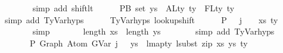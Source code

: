 \begin{isabellebody}
\ \ \ \ \ \ \isamarkupfalse%
\ {\isacharparenleft}{\kern0pt}simp\ add{\isacharcolon}{\kern0pt}\ shift{\isacharunderscore}{\kern0pt}lt{\isacharparenright}{\kern0pt}\isanewline
\isanewline
\ \ \ \ \isamarkupfalse%
\ P{}B{\isacharcolon}{\kern0pt}\ {\isachardoublequoteopen}set\ ys\ {\isasyminter}\ ALty\ ty{\isacharprime}{\kern0pt}\ {\isacharminus}{\kern0pt}\ FLty\ ty{\isacharprime}{\kern0pt}\ {\isacharequal}{\kern0pt}\ {\isacharbraceleft}{\kern0pt}{\isacharbraceright}{\kern0pt}{\isachardoublequoteclose}\isanewline
\ \ \ \ \ \ \isamarkupfalse%
\ {\isacharparenleft}{\kern0pt}simp\ add{\isacharcolon}{\kern0pt}\ TyVar{\isachardot}{\kern0pt}hyps{\isacharparenleft}{\kern0pt}{}{\isacharparenright}{\kern0pt}{\isacharparenright}{\kern0pt}\isanewline
\isanewline
\ \ \ \ \isamarkupfalse%
\ TyVar{\isachardot}{\kern0pt}hyps{\isacharparenleft}{\kern0pt}{}{\isacharparenright}{\kern0pt}\ lookup{\isacharunderscore}{\kern0pt}shift\isanewline
\ \ \ \ \isamarkupfalse%
\ P{}{\isacharcolon}{\kern0pt}\ {\isachardoublequoteopen}{\isasymGamma}{}\ {\isacharbang}{\kern0pt}\ {\isacharparenleft}{\kern0pt}j\ {\isacharminus}{\kern0pt}\ {}{\isacharparenright}{\kern0pt}\ {\isacharequal}{\kern0pt}\ {\isacharparenleft}{\kern0pt}xs{\isacharprime}{\kern0pt}{\isacharcomma}{\kern0pt}\ ty{\isacharprime}{\kern0pt}{\isacharparenright}{\kern0pt}{\isachardoublequoteclose}\isanewline
\ \ \ \ \ \ \isamarkupfalse%
\ simp\isanewline
\isanewline
\ \ \ \ \isamarkupfalse%
\ \isamarkupfalse%
\ {\isachardoublequoteopen}length\ xs{\isacharprime}{\kern0pt}\ {\isacharequal}{\kern0pt}\ length\ ys{\isachardoublequoteclose}\isanewline
\ \ \ \ \ \ \isamarkupfalse%
\ {\isacharparenleft}{\kern0pt}simp\ add{\isacharcolon}{\kern0pt}\ TyVar{\isachardot}{\kern0pt}hyps{\isacharparenleft}{\kern0pt}{}{\isacharcomma}{\kern0pt}{}{\isacharparenright}{\kern0pt}{\isacharparenright}{\kern0pt}\isanewline
\isanewline
\ \ \ \ \isamarkupfalse%
\ \isamarkupfalse%
\isanewline
\ \ \ \ \ \ {\isachardoublequoteopen}{\isasymGamma}{}\ {\isasymturnstile}{\isacharbraceleft}{\kern0pt}P{\isacharbraceright}{\kern0pt}\ Graph\ {\isacharparenleft}{\kern0pt}Atom\ {\isacharparenleft}{\kern0pt}GVar\ {\isacharparenleft}{\kern0pt}j\ {\isacharminus}{\kern0pt}\ {}{\isacharparenright}{\kern0pt}{\isacharparenright}{\kern0pt}\ ys{\isacharparenright}{\kern0pt}\ {\isacharcolon}{\kern0pt}\ lmap{\isacharunderscore}{\kern0pt}ty\ {\isacharparenleft}{\kern0pt}lsubst\ {\isacharparenleft}{\kern0pt}zip\ xs{\isacharprime}{\kern0pt}\ ys{\isacharparenright}{\kern0pt}{\isacharparenright}{\kern0pt}\ ty{\isacharprime}{\kern0pt}{\isachardoublequoteclose}\isanewline

\end{isabellebody}
